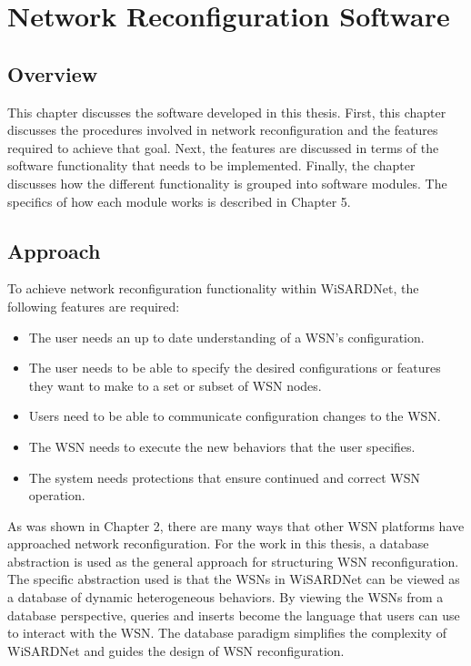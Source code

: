 \chapter{Network Reconfiguration Software} %
\label{Chapter 4}
\lhead{} %

\section{Overview}
This chapter discusses the software developed in this thesis. First, this chapter discusses the procedures involved in network reconfiguration and the features required to achieve that goal. Next, the features are discussed in terms of the software functionality that needs to be implemented. Finally, the chapter discusses how the different functionality is grouped into software modules. The specifics of how each module works is described in Chapter 5.

\section{Approach}
To achieve network reconfiguration functionality within WiSARDNet, the following features are required: 

\begin{itemize}
	\item The user needs an up to date understanding of a WSN's configuration.
	\item The user needs to be able to specify the desired configurations or features they want to make to a set or subset of WSN nodes.
	\item Users need to be able to communicate configuration changes to the WSN. 
	\item The WSN needs to execute the new behaviors that the user specifies.
	\item The system needs protections that ensure continued and correct WSN operation.
\end{itemize} 

As was shown in Chapter 2, there are many ways that other WSN platforms have approached network reconfiguration. For the work in this thesis, a database abstraction is used as the general approach for structuring WSN reconfiguration. The specific abstraction used is that the WSNs in WiSARDNet can be viewed as a database of dynamic heterogeneous behaviors. By viewing the WSNs from a database perspective, queries and inserts become the language that users can use to interact with the WSN. The database paradigm simplifies the complexity of WiSARDNet and guides the design of WSN reconfiguration.

